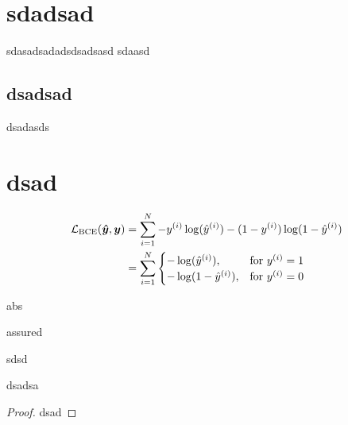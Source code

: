 \documentclass[]{subook}
\begin{document}
    \section{sdadsad}
    sdasadsadadsdsadsasd sdaasd
    \lipsum[1-3]
    \subsection{dsadsad}
    dsadasds
    \lipsum[1-4]
    \section{dsad}
    \lipsum[2-6]

    
\begin{definition}[ds]
    \begin{equation}
        \begin{aligned}
            \mathcal{L} _{\rm{BCE}}(\boldsymbol{\hat{y} },\boldsymbol{y})&=\sum ^N_{i=1}-y^{(i)}\log (\hat{y}^{(i)})- (1-y^{(i)})\log (1-\hat{y}^{(i)})\\
            &=\sum^N_{i=1}
            \begin{cases}
            -\log (\hat{y}^{(i)}),  & \text{for $y^{(i)}=1$} \\
            -\log (1-\hat{y}^{(i)}), & \text{for $y^{(i)}=0$}
            \end{cases}
        \end{aligned}
    \end{equation}
\end{definition}


\lipsum[2]
\begin{theorem}[ad]
    abs
\end{theorem}

assured
\begin{lemma}[asd]
    sdsd
\end{lemma}


\lipsum[1]
\begin{postulate}
    dsadsa
\end{postulate}
\lipsum[4]
\begin{proof}
    dsad
\end{proof}
\lipsum[4-6]
\end{document}
